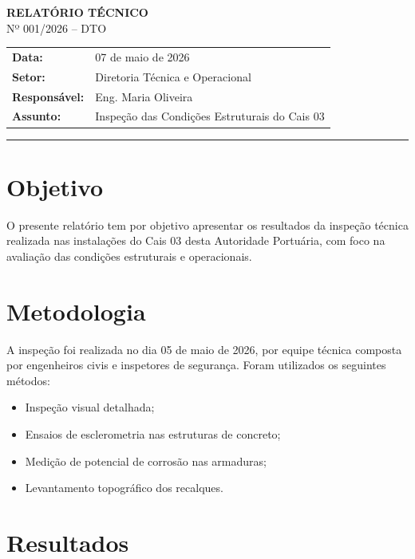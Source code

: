 \documentclass[12pt,a4paper]{article}
\begin{document}
\onehalfspacing

\begin{center}
  \vspace*{1cm}
  {\LARGE \textbf{RELATÓRIO TÉCNICO}}\\[0.5cm]
  {\large Nº 001/2026 -- DTO}\\[1cm]
\end{center}

\begin{tabular}{@{}ll@{}}
  \textbf{Data:} & 07 de maio de 2026 \\
  \textbf{Setor:} & Diretoria Técnica e Operacional \\
  \textbf{Responsável:} & Eng. Maria Oliveira \\
  \textbf{Assunto:} & Inspeção das Condições Estruturais do Cais 03 \\
\end{tabular}

\vspace{1cm}
\hrule
\vspace{0.5cm}

\section{Objetivo}

O presente relatório tem por objetivo apresentar os resultados da inspeção técnica realizada nas instalações do Cais 03 desta Autoridade Portuária, com foco na avaliação das condições estruturais e operacionais.

\section{Metodologia}

A inspeção foi realizada no dia 05 de maio de 2026, por equipe técnica composta por engenheiros civis e inspetores de segurança. Foram utilizados os seguintes métodos:

\begin{itemize}[leftmargin=2cm]
  \item Inspeção visual detalhada;
  \item Ensaios de esclerometria nas estruturas de concreto;
  \item Medição de potencial de corrosão nas armaduras;
  \item Levantamento topográfico dos recalques.
\end{itemize}

\section{Resultados}
\end{document}
